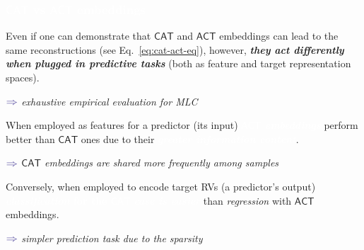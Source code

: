 \documentclass[xcolor={usenames,dvipsnames,svgnames}, compress]{beamer}
\newcommand{\highlighttext}[2][yellow]{{\colorbox{#1}{\textcolor{white}{#2}}}}
\begin{document}
\begin{frame}[t]
  \frametitle{\highlighttext[bgrey3]{$\mathsf{CAT}$ vs $\mathsf{ACT}$
    embeddings}}
  \footnotesize
  Even if one can demonstrate that $\mathsf{CAT}$ and $\mathsf{ACT}$
embeddings can lead to the same reconstructions (see
Eq.~\ref{eq:cat-act-eq}), however, \emph{\textbf{they act differently when plugged
in predictive tasks}} (both as feature and target representation spaces).
\begin{minipage}{1.0\linewidth}
      \raggedleft
      $\color{violet}\boldsymbol\Rightarrow$
      \scriptsize
     \emph{exhaustive empirical evaluation for MLC}
\end{minipage}
\par\bigskip

%
%
When employed as features for a predictor (its input)
\highlighttext[tomato0]{\emph{\textbf{$\mathsf{ACT}$ embeddings}}} perform better than $\mathsf{CAT}$ ones
due to their \highlighttext[tomato0]{\emph{\textbf{greater information content}}}.
\begin{minipage}{1.0\linewidth}
     \vspace{7pt}
      \raggedleft
      $\color{violet}\boldsymbol\Rightarrow$
      \scriptsize
     \emph{$\mathsf{CAT}$ embeddings are shared more frequently among samples}
\end{minipage}
\par\bigskip
%
%

Conversely, when employed to encode target RVs (a predictor's output)
\highlighttext[tomato0]{\textbf{\emph{classification} for the $\mathsf{CAT}$}
\textbf{\emph{case is easier}}} than \emph{regression} with $\mathsf{ACT}$ embeddings.
\begin{minipage}{1.0\linewidth}
    \vspace{7pt}
      \raggedleft
      $\color{violet}\boldsymbol\Rightarrow$
      \scriptsize
     \emph{simpler prediction task due to the sparsity}
\end{minipage}

 
\end{frame}
\end{document}
